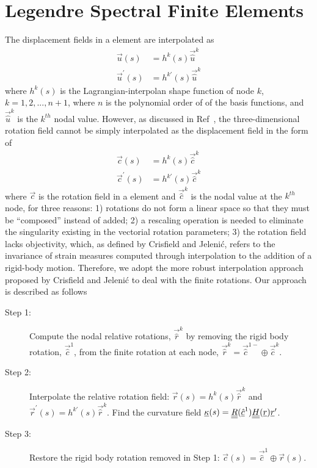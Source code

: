 \section{Legendre Spectral Finite Elements}
The displacement fields in a element are interpolated as
\begin{align}
    \label{InterpolateDisp}
    \vec{u}(s) &= h^k(s) \vec{\hat{u}}^k \\
    \label{InterpolateDispp}
    \vec{u}^\prime(s) &= h^{k\prime}(s) \vec{\hat{u}}^k
\end{align}
where $h^k(s)$ is the
Lagrangian-interpolan shape function of node $k$, $k=1,2,...,n+1$, where $n$
is the polynomial order of of the basis functions, and $\vec{\hat{u}}^k$ is
the $k^{th}$ nodal value.
However, as discussed in Ref~\cite{Bauchau-etal:2009}, the three-dimensional rotation field cannot be
simply interpolated as the displacement field in the form of
\begin{align}
    \label{InterpolateRot}
    \vec{c}(s) &= h^k(s) \vec{\hat{c}}^k \\
    \label{InterpolateRotp}
    \vec{c}^\prime(s) &= h^{k \prime}(s) \vec{\hat{c}}^k 
\end{align}    
where $\vec{c}$ is the rotation field in a element and $\vec{\hat{c}}^k$ is
the nodal value at the $k^{th}$ node, for three reasons: 1) rotations do not
form a linear space so that they must be  ``composed'' instead of added; 2)
a rescaling operation is needed to eliminate the singularity existing in the
vectorial rotation parameters; 3) the rotation field lacks objectivity,
which, as
defined by Crisfield and Jeleni\'c\cite{Crisfield1999}, refers to the
invariance of strain measures computed through interpolation to the addition
of a rigid-body motion. Therefore, we adopt the more robust interpolation
approach proposed by Crisfield and Jeleni\'c \cite{Crisfield1999} to deal
with the finite rotations. Our approach is described as follows
\begin{description}
    \item[Step 1:] Compute the nodal relative rotations, $\vec{\hat{r}}^k$ by removing the rigid body rotation, $\vec{\hat{c}}^1$, from the finite rotation at each node, $\vec{\hat{r}}^k = \vec{\hat{c}}^{1-} \oplus \vec{\hat{c}}^k$.
    \item[Step 2:] Interpolate the relative rotation field: $\vec{r}(s) = h^k(s) \vec{\hat{r}}^k$ and $\vec{r}^\prime(s) = h^{k \prime}(s) \vec{\hat{r}}^k$. Find the curvature field $\underline{\kappa}(s) = \underline{\underline{R}}(\underline{\hat{c}}^1) \underline{\underline{H}}(\underline{r}) \underline{r}^\prime$.
    \item[Step 3:] Restore the rigid body rotation removed in Step 1: $\vec{c}(s) = \vec{\hat{c}}^1 \oplus \vec{r}(s)$.
\end{description} 
